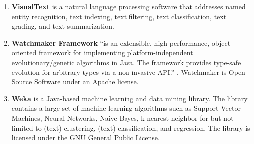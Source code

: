 \begin{enumerate}
	\item \textbf{VisualText} \cite{visualtext} is a natural language processing software that addresses named entity recognition, text indexing, text filtering, text classification, text grading, and text summarization.

	\item \textbf{Watchmaker Framework} ``is an extensible, high-performance, object-oriented framework for implementing platform-independent evolutionary/genetic algorithms in Java. The framework provides type-safe evolution for arbitrary types via a non-invasive API.'' \cite{watchmaker}. Watchmaker is Open Source Software under an Apache license.

	\item \textbf{Weka} \cite{hall2009weka} is a Java-based machine learning and data mining library. The library contains a large set of machine learning algorithms such as Support Vector Machines, Neural Networks, Naive Bayes, k-nearest neighbor for but not limited to (text) clustering, (text) classification, and regression.
The library is licensed under the GNU General Public License.

\end{enumerate}
